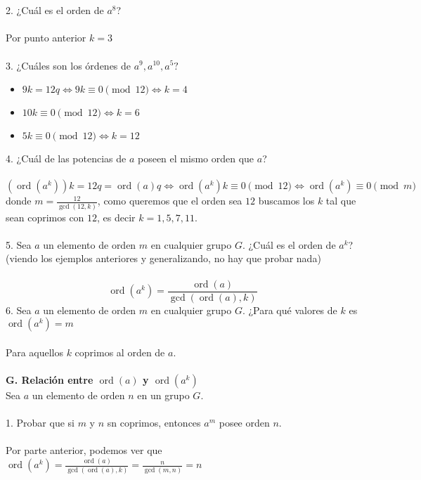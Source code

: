 \documentclass{article}
\begin{document}
\\
\\
2. ¿Cuál es el orden de $a^{8}$?
\\
\\
Por punto anterior $k=3$
\\
\\
3. ¿Cuáles son los órdenes de $a^{9},a^{10},a^{5}?$
\begin{itemize}
    \item $9k =12q \Longleftrightarrow 9k \equiv 0 \pmod{12} \Longleftrightarrow k=4$ 
    \item $10k \equiv 0 \pmod{12} \Longleftrightarrow k = 6$
    \item $5k \equiv 0 \pmod{12} \Longleftrightarrow k =12$
\end{itemize}
4. ¿Cuál de las potencias de $a$ poseen el mismo orden que $a$?
\\
\\
$(\operatorname{ord}(a^{k}))k=12q=\operatorname{ord}(a)q \Longleftrightarrow \operatorname{ord}(a^{k})k \equiv 0 \pmod{12} \Longleftrightarrow \operatorname{ord}(a^{k}) \equiv 0 \pmod{m}$ donde $m = \frac{12}{\gcd{(12,k)}}$, como queremos que el orden sea $12$ buscamos los $k$ tal que sean coprimos con $12$, es decir $k=1,5,7,11$.
\\
\\
5. Sea $a$ un elemento de orden $m$ en cualquier grupo $G$. ¿Cuál es el orden de $a^{k}$? (viendo los ejemplos anteriores y generalizando, no hay que probar nada)
\\
\\
\begin{equation*}
    \operatorname{ord}(a^{k})=\frac{\operatorname{ord}(a)}{\gcd{(\operatorname{ord}(a),k)}}
\end{equation*}
6. Sea $a$ un elemento de orden $m$ en cualquier grupo $G$. ¿Para qué valores de $k$ es $\operatorname{ord}(a^{k})=m$
\\
\\
Para aquellos $k$ coprimos al orden de $a$.
\\
\\
\textbf{G. Relación entre $\operatorname{ord}(a)$ y $\operatorname{ord}(a^k)$}
\\
Sea $a$ un elemento de orden $n$ en un grupo $G$.
\\
\\
1. Probar que si $m$ y $n$ sn coprimos, entonces $a^{m}$ posee orden $n$.
\\
\\
Por parte anterior, podemos ver que $\operatorname{ord}(a^{k})=\frac{\operatorname{ord}(a)}{\gcd{(\operatorname{ord}(a),k)}}=\frac{n}{\gcd{(m,n)}}=n$
\end{document}

